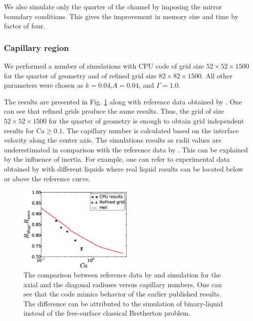 \documentclass{CFD2011}
\newcommand{\Ca}{\mathrm{Ca}}
\begin{document}
We also simulate only the quarter of the channel by imposing the mirror boundary conditions. This
gives the improvement in memory size and time by factor of four.  
\subsubsection{Capillary region}
We performed a number of simulations with CPU code of grid size $52\times52\times 1500$ for the
quarter of geometry and of refined grid size $82\times82\times 1500$. All other parameters were
chosen as
$k=0.04$,$A=0.04$, and $\Gamma=1.0$. 

The results are presented in Fig.
\ref{fig:capillary:comparison:3d} along with reference data obtained by \citet{heil-threedim}. One
can see that refined grids produce the same results. Thus, the grid of size $52\times52\times 1500$
for the quarter of geometry is enough to obtain grid independent results for $\Ca\geq0.1$. The
capillary number is calculated based on the interface velocity along the center axis. The
simulations results as radii values are underestimated in comparison with the reference data by
\citet{heil-threedim}. This can be explained by the influence of inertia. For example, one can refer
to experimental data obtained by \citet{shikazono-square} with different liquids where real liquid
results can be located below or above the reference curve.
\begin{figure}
\includegraphics[width=0.5\textwidth]{Figures/capillaries_comparison_3d.eps}
\caption{The comparison between reference data by \citet{heil-threedim} and simulation for the axial
and the diagonal radiuses
versus capillary numbers. One can see that the code mimics
behavior of the earlier published results. The difference can be attributed to the simulation of
binary-liquid instead of the free-surface classical Bretherton
problem. \label{fig:capillary:comparison:3d}}
\end{figure}
\end{document}
